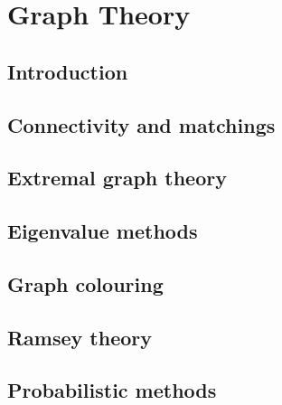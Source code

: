\documentclass[main.tex]{subfiles}
\begin{document}
	\chapter{Graph Theory}
		\section{Introduction}
		
		\section{Connectivity and matchings}
		
		\section{Extremal graph theory}
		
		\section{Eigenvalue methods}
		
		\section{Graph colouring}
		
		\section{Ramsey theory}
		
		\section{Probabilistic methods}		
\end{document}
